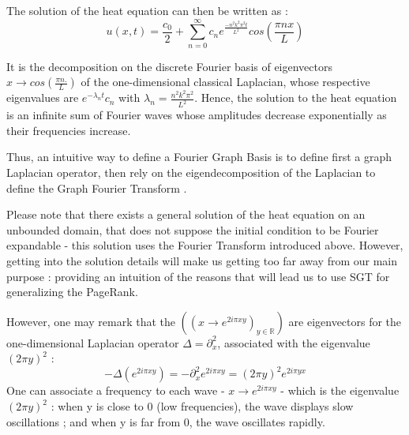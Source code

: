 \documentclass[sn-mathphys]{sn-jnl}%
\theoremstyle{thmstyleone}%
\theoremstyle{thmstyletwo}%
\theoremstyle{thmstylethree}%
\begin{document}
The solution of the heat equation can then be written as :
\begin{equation}\label{eq:heat_eq_classical_solution}
    u(x,t) = \frac{c_0}{2} + \sum_{n=0}^{\infty} c_n e^{\frac{-n^2 k^2 \pi^2 t}{L^2}} cos(\frac{\pi n x}{L})
\end{equation}

It is the decomposition on the discrete Fourier basis of eigenvectors
$x \rightarrow cos(\frac{\pi n .}{L})$ of the one-dimensional
classical Laplacian, whose respective eigenvalues are
$e^{-\lambda_n t} c_n$ with $\lambda_n = \frac{n^2 k^2
  \pi^2}{L^2}$. Hence, the solution to the heat equation is an
infinite sum of Fourier waves whose amplitudes decrease exponentially
as their frequencies increase.

Thus, an intuitive way to define a Fourier Graph Basis is to define
first a graph Laplacian operator, then rely on the eigendecomposition
of the Laplacian to define the Graph Fourier Transform
\cite{shuman_narang_frossard_ortega_vandergheynst_2013,
  ricaud_borgnat_tremblay_goncalves_vandergheynst_2019}.

Please note that there exists a general solution of the heat equation
on an unbounded domain, that does not suppose the initial condition to
be Fourier expandable - this solution uses the Fourier Transform
introduced above. However, getting into the solution details will make
us getting too far away from our main purpose : providing an intuition
of the reasons that will lead us to use SGT for generalizing the
PageRank.

However, one may remark that the
$((x \rightarrow e^{2i\pi x y })_{y\in \mathbb{R}})$ are eigenvectors
for the one-dimensional Laplacian operator $\Delta = \partial^2_{x}$,
associated with the eigenvalue $(2\pi y)^2$ :
\begin{equation}
  - \Delta (e^{2i\pi x y}) = - \partial^2_x e^{2i\pi x y} = (2\pi y)^2  e^{2i\pi y x }
\end{equation}
One can associate a frequency to each wave -
$x \rightarrow e^{2i\pi x y }$ - which is the eigenvalue $(2\pi y)^2$
: when y is close to 0 (low frequencies), the wave displays slow
oscillations ; and when y is far from 0, the wave oscillates rapidly.
\end{document}

